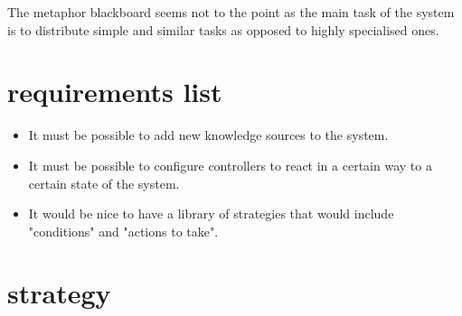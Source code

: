 \documentclass[]{lofar}
\begin{document}
    The metaphor blackboard seems not to the point as the main task of
    the system is to distribute simple and similar tasks as opposed to
    highly specialised ones.

\newcommand{\dbappendix}[1]{\section{#1}}%

\appendix

  \dbappendix{requirements list}
  \label{requirements list}\hypertarget{requirements list}{}%

    \begin{itemize}

      \item

        It must be possible to add new knowledge sources to the system.

      \item

        It must be possible to configure controllers to react in a
        certain way to a certain state of the system.

      \item

        It would be nice to have a library of strategies that would
        include "conditions" and "actions to take".

    \end{itemize}

  \dbappendix{strategy}
  \label{start script}\hypertarget{start script}{}%
\end{document}
